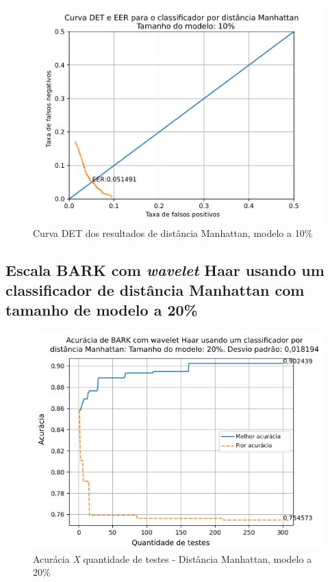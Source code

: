 			\begin{figure}[!ht]
				\centering
				\includegraphics[width=.6\linewidth]{images/results/det/DET_for_classifier_Manhattan_10}
				\caption{Curva DET dos resultados de distância Manhattan, modelo a 10\%}
				\label{fig:detforclassifiermanhattan10}
			\end{figure}
	
			\FloatBarrier
		\subsection{Escala BARK com \textit{wavelet} Haar usando um classificador de distância Manhattan com tamanho de modelo a 20\%}
			
			
	
			\begin{figure}[!ht]
				\centering
				\includegraphics[width=.6\linewidth]{images/results/confusionMatrices/classifier_Manhattan_20.png}
				\caption{Acurácia \textit{X} quantidade de testes - Distância Manhattan, modelo a 20\%}
				\label{fig:classifiermanhattan20}
			\end{figure}
		
